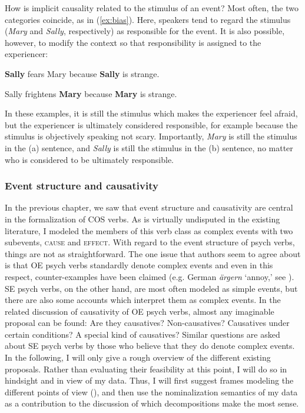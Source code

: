 How is implicit causality related to the stimulus of an event? Most often, the two categories coincide, as in (\ref{ex:bias}). Here, speakers tend to regard the stimulus (\textit{Mary} and \textit{Sally}, respectively) as responsible for the event. It is also possible, however, to modify the context so that responsibility is assigned to the experiencer:

\begin{exe}[(123)]
	{\begin{xlist}
		\item \label{ex:bias1-mod} \textbf{Sally} fears Mary because \textbf{Sally} is strange. 
		\item \label{ex:bias2-mod} Sally frightens \textbf{Mary} because \textbf{Mary} is strange.
	\end{xlist}
	}
\end{exe}

\noindent In these examples, it is still the stimulus which makes the experiencer feel afraid, but the experiencer is ultimately considered responsible, for example because the stimulus is objectively speaking not scary. Importantly, \textit{Mary} is still the stimulus in the (a) sentence, and \textit{Sally} is still the stimulus in the (b) sentence, no matter who is considered to be ultimately responsible.

\subsubsection{Event structure and causativity}
\label{sec:psy-input-prev-caus}

In the previous chapter, we saw that event structure and causativity are central in the formalization of COS verbs. As is virtually undisputed in the existing literature, I modeled the members of this verb class as complex events with two subevents, \textsc{cause} and \textsc{effect}. With regard to the event structure of psych verbs, things are not as straightforward. The one issue that authors seem to agree about is that OE psych verbs standardly denote complex events \textendash{} and even in this respect, counter-examples have been claimed (e.g. German \textit{\"argern} `annoy,' see \citealt{Hirsch.2018}). SE psych verbs, on the other hand, are most often modeled as simple events, but there are also some accounts which interpret them as complex events. 
In the related discussion of causativity of OE psych verbs, almost any imaginable proposal can be found: Are they causatives? Non-causatives? Causatives under certain conditions? A special kind of causatives? Similar questions are asked about SE psych verbs by those who believe that they do denote complex events.	
In the following, I will only give a rough overview of the different existing proposals. Rather than evaluating their feasibility at this point, I will do so in hindsight and in view of my data. Thus, I will first suggest frames modeling the different points of view (), and then use the nominalization semantics of my data as a contribution to the discussion of which decompositions make the most sense. 
 
